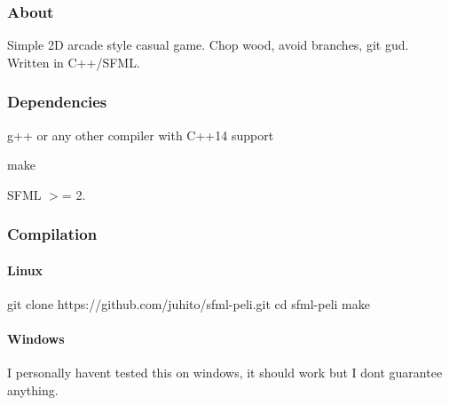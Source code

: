 \subsubsection*{About}

Simple 2D arcade style casual game. Chop wood, avoid branches, git gud. Written in C++/\+S\+F\+ML.

\subsubsection*{Dependencies}


\begin{DoxyItemize}
\item g++ or any other compiler with C++14 support
\item make
\item S\+F\+ML $>$= 2.
\end{DoxyItemize}

\subsubsection*{Compilation}

\paragraph*{Linux}


\begin{DoxyCode}
git clone https://github.com/juhito/sfml-peli.git
cd sfml-peli
make
\end{DoxyCode}


\paragraph*{Windows}

I personally haven\textquotesingle{}t tested this on windows, it should work but I don\textquotesingle{}t guarantee anything. 